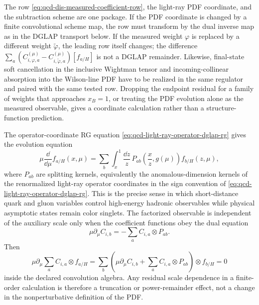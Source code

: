 \begin{remark}
The row \eqref{eq:qcd-dis-measured-coefficient-row}, the light-ray PDF
coordinate, and the subtraction scheme are one package.  If the PDF coordinate
is changed by a finite convolutional scheme map, the row must transform by the
dual inverse map as in the DGLAP transport below.  If the measured weight
\(\varphi\) is replaced by a different weight \(\widetilde\varphi\), the
leading row itself changes; the difference
\(\sum_a(C_{i,\varphi,a}^{(\mu)}-C_{i,\widetilde\varphi,a}^{(\mu)})[f_{a/H}]\)
is not a DGLAP remainder.  Likewise, final-state soft cancellation in the
inclusive Wightman tensor and incoming-collinear absorption into the
Wilson-line PDF have to be realized in the same regulator and paired with the
same tested row.  Dropping the endpoint residual for a family of weights that
approaches \(x_B=1\), or treating the PDF evolution alone as the measured
observable, gives a coordinate calculation rather than a structure-function
prediction.
\end{remark}

The operator-coordinate RG equation
\eqref{eq:qcd-light-ray-operator-dglap-rg} gives the evolution equation
\begin{equation}
  \mu\frac{\dd}{\dd\mu} f_{a/H}(x,\mu)
  =
  \sum_b\int_x^1\frac{\dd z}{z}\,
  P_{ab}\!\left(\frac{x}{z},g(\mu)\right)f_{b/H}(z,\mu),
  \label{eq:dglap-evolution}
\end{equation}
where \(P_{ab}\) are splitting kernels, equivalently the anomalous-dimension
kernels of the renormalized light-ray operator coordinates in the sign
convention of
\eqref{eq:qcd-light-ray-operator-dglap-rg}.  This is the precise sense in
which short-distance quark and gluon variables control high-energy hadronic
observables while physical asymptotic states remain color singlets.  The
factorized observable is independent of the auxiliary scale only when the
coefficient functions obey the dual equation
\begin{equation}
  \mu\partial_\mu C_{i,b}
  =
  -\sum_a C_{i,a}\otimes P_{ab}.
  \label{eq:qcd-dis-coefficient-dual-rg}
\end{equation}
Then
\[
  \mu\partial_\mu
  \sum_a C_{i,a}\otimes f_{a/H}
  =
  \sum_b
  \left(
    \mu\partial_\mu C_{i,b}
    +
    \sum_a C_{i,a}\otimes P_{ab}
  \right)\otimes f_{b/H}
  =
  0
\]
inside the declared convolution algebra.  Any residual scale dependence in a
finite-order calculation is therefore a truncation or power-remainder effect,
not a change in the nonperturbative definition of the PDF.

